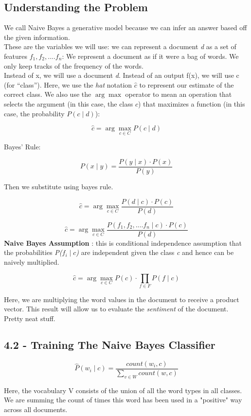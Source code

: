 \documentclass{article}
\begin{document}
\subsection{Understanding the Problem}
We call Naive Bayes a generative model because we can infer an answer based off the given information.
\\These are the variables we will use: we can represent a document \textit{d} as a set of features $f_1, f_2,.... f_n$:
We represent a document as if it were a bag of words. We only keep tracks of the frequency of the words.
\\Instead of x, we will use a document \textit{d}. Instead of an output f(x), we will use c (for “class”).
Here, we use the \emph{hat} notation $\hat{c}$ to represent our estimate of the correct class.
We also use the $\arg\max$ operator to mean an operation that selects the argument (in this case, the class $c$)
that maximizes a function (in this case, the probability $P(c \mid d)$):

\[
    \hat{c} = \arg\max_{c \in C} P(c \mid d)
\]

Bayes' Rule:

\[
    P(x \mid y) = \frac{P(y \mid x) \cdot P(x)}{P(y)}
\]

Then we substitute using bayes rule.

\[
    \hat{c} = \arg\max_{c \in C} \frac{P(d \mid c) \cdot P(c)}{P(d)}
\]



\[
    \hat{c} = \arg\max_{c \in C} \frac{P(f_1, f_2,....f_n\mid c) \cdot P(c)}{P(d)}
\]
\textbf{Naive Bayes Assumption} : this is conditional independence assumption that the probabilities \textit{P($f_i \mid c$)}
are independent given the class \textit{c} and hence can be naively multiplied.

\[
    \hat{c} = \arg\max_{c \in C} P(c) \cdot \prod_{f \in F} P(f \mid c)
\]

Here, we are multiplying the word values in the document to receive a product vector. This result will allow us to evaluate
the \textit{sentiment} of the document. Pretty neat stuff.

\subsection{4.2 - Training The Naive Bayes Classifier}
\[
    \hat{P}(w_i \mid c) = \frac{count(w_i, c)}{\sum_{v \in W}{count(w,c)}}
\]

Here, the vocabulary V consists of the union of all the word types in all classes. We are summing the count of
times this word has been used in a "positive" way across all documents.
\end{document}
